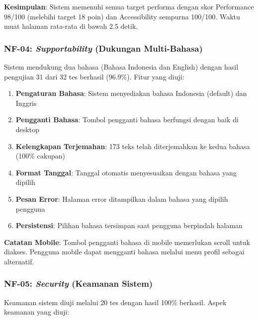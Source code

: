 \textbf{Kesimpulan}: Sistem memenuhi semua target performa dengan skor Performance 98/100 (melebihi target 18 poin) dan Accessibility sempurna 100/100. Waktu muat halaman rata-rata di bawah 2.5 detik.

\subsubsection{NF-04: \textit{Supportability} (Dukungan Multi-Bahasa)}

Sistem mendukung dua bahasa (Bahasa Indonesia dan English) dengan hasil pengujian 31 dari 32 tes berhasil (96.9\%). Fitur yang diuji:

\begin{enumerate}
	\item \textbf{Pengaturan Bahasa}: Sistem menyediakan bahasa Indonesia (default) dan Inggris
	\item \textbf{Pengganti Bahasa}: Tombol pengganti bahasa berfungsi dengan baik di desktop
	\item \textbf{Kelengkapan Terjemahan}: 173 teks telah diterjemahkan ke kedua bahasa (100\% cakupan)
	\item \textbf{Format Tanggal}: Tanggal otomatis menyesuaikan dengan bahasa yang dipilih
	\item \textbf{Pesan Error}: Halaman error ditampilkan dalam bahasa yang dipilih pengguna
	\item \textbf{Persistensi}: Pilihan bahasa tersimpan saat pengguna berpindah halaman
\end{enumerate}

\textbf{Catatan Mobile}: Tombol pengganti bahasa di mobile memerlukan scroll untuk diakses. Pengguna mobile dapat mengganti bahasa melalui menu profil sebagai alternatif.

\subsubsection{NF-05: \textit{Security} (Keamanan Sistem)}

Keamanan sistem diuji melalui 20 tes dengan hasil 100\% berhasil. Aspek keamanan yang diuji:

